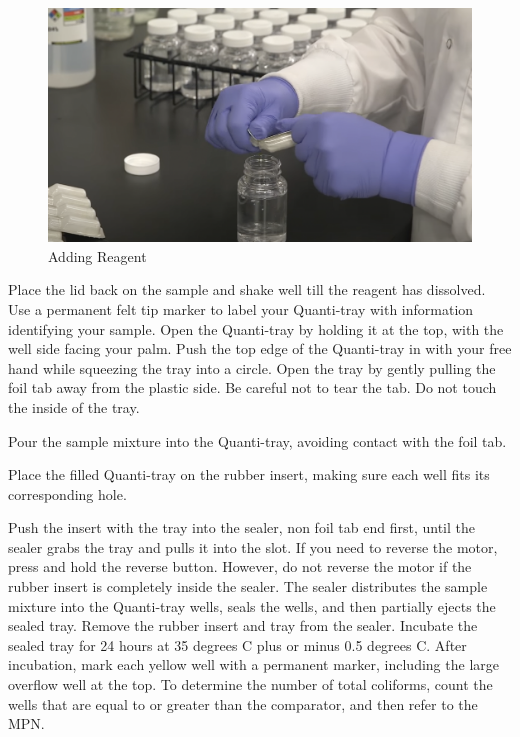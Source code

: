\documentclass[12pt]{../SOP4_alpha}\usepackage[]{graphicx}\usepackage[]{xcolor}
\begin{document}
\begin{figure}
\includegraphics{AddingReagent.png}
\caption[width=0.8\textwidth]{Adding Reagent}
\label{fig:Adding Reagent}
\end{figure}

\NP Place the lid back on the sample and shake well till the reagent has dissolved.
\NP Use a permanent felt tip marker to label your Quanti-tray with information identifying your sample. 
\NP Open the Quanti-tray by holding it at the top, with the well side facing your palm. Push the top edge of the Quanti-tray in with your free hand while squeezing the tray into a circle. Open the tray by gently pulling the foil tab away from the plastic side. Be careful not to tear the tab. Do not touch the inside of the tray. 


\NP Pour the sample mixture into the Quanti-tray, avoiding contact with the foil tab.

\NP Place the filled Quanti-tray on the rubber insert, making sure each well fits its corresponding hole.

\NP Push the insert with the tray into the sealer, non foil tab end first, until the sealer grabs the tray and pulls it into the slot. If you need to reverse the motor, press and hold the reverse button. However, do not reverse the motor if the rubber insert is completely inside the sealer.
The sealer distributes the sample mixture into the Quanti-tray wells, seals the wells, and then partially ejects the sealed tray.
\NP Remove the rubber insert and tray from the sealer.
\NP Incubate the sealed tray for 24 hours at 35 degrees C plus or minus 0.5 degrees C.
\NP After incubation, mark each yellow well with a permanent marker, including the large overflow well at the top. To determine the number of total coliforms, count the wells that are equal to or greater than the comparator, and then refer to the MPN.
\end{document}
